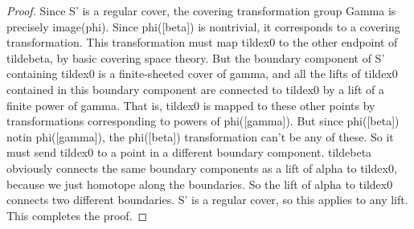 \documentclass[12pt]{amsart}
\theoremstyle{definition}
\theoremstyle{remark}
\begin{document}
\begin{proof}
Since S' is a regular cover, the covering transformation group Gamma is
precisely image(phi). Since phi([beta]) is nontrivial, it corresponds to
a covering transformation. This transformation must map tildex0 to the other
endpoint of tildebeta, by basic covering space theory. But the boundary
component of S' containing tildex0 is a finite-sheeted cover of gamma, and all
the lifts of tildex0 contained in this boundary component are connected to
tildex0 by a lift of a finite power of gamma. That is, tildex0 is mapped to
these other points by transformations corresponding to powers of phi([gamma]).
But since phi([beta]) notin phi([gamma]), the phi([beta]) transformation can't
be any of these. So it must send tildex0 to a point in a different boundary
component. tildebeta obviously connects the same boundary components as a lift
of alpha to tildex0, because we just homotope along the boundaries. So the lift
of alpha to tildex0 connects two different boundaries. S' is a regular cover,
so this applies to any lift. This completes the proof.

\end{proof}
\end{document}
